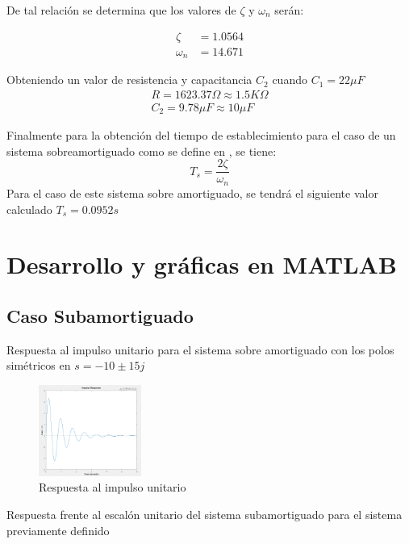 \documentclass[conference]{IEEEtran}
\begin{document}
	De tal relación se determina que los valores de $\zeta$ y $\omega_n$ serán:
	
	\begin{align}
		\zeta &= 1.0564 \\
		\omega_n &= 14.671 
	\end{align}
	
	Obteniendo un valor de resistencia y capacitancia $C_2$ cuando $C_1 = 22 \mu F \label{eq:sobre-capacitancia-c1}$ 
	\begin{align}
		R = 1623.37 \Omega \approx 1.5K \Omega \label{eq:sobre-resistencia}\\ 
		C_2 = 9.78 \mu F \approx 10 \mu F \label{eq:sobre-capacitancia-c2}
	\end{align}	
	
	Finalmente para la obtención del tiempo de establecimiento para el caso de un sistema sobreamortiguado como se define en \cite{sistemas_segundo_orden}, se tiene:
	\begin{equation}
		T_s = \frac{2\zeta}{\omega_n}
		\label{eq:ts-sobreamortiguada}
	\end{equation}
	Para el caso de este sistema sobre amortiguado, se tendrá el siguiente valor calculado 
	$ T_s = 0.0952s$ 
	
	\section{Desarrollo y gráficas en MATLAB}
	\subsection{Caso Subamortiguado}
	
	Respuesta al impulso unitario para el sistema sobre amortiguado con los polos simétricos en $ s = -10 \pm 15j$
	\begin{figure}[h]
		\centering
		\includegraphics[width=0.3\textwidth]{media/sub-impulso}
		\caption{Respuesta al impulso unitario}
		\label{fig:sub-impulso}
	\end{figure}
	
	Respuesta frente al escalón unitario del sistema subamortiguado para el sistema previamente definido
	
\end{document}
